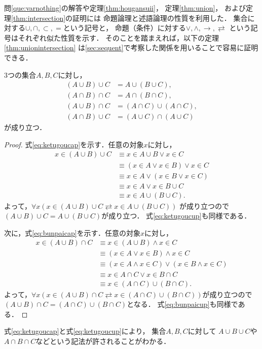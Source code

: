    問\ref{que:varnothing}の解答や定理\ref{thm:hougansuii}，
   定理\ref{thm:union}，
   および定理\ref{thm:intersection}の証明には
   命題論理と述語論理の性質を利用した．
   集合に対する$\cup ,  \cap ,  \subset ,  =$という記号と，
   命題（条件）に対する$\lor ,  \land ,  \to ,  \rightleftarrows$
   という記号はそれぞれ似た性質を示す．
   そのことを踏まえれば，以下の定理\ref{thm:unionintersection}
   は\ref{sec:sequent}で考察した関係を用いることで容易に証明できる．
   \begin{thm} \label{thm:unionintersection}
     3つの集合$A,  B,  C$に対し，
     \begin{align}
       (A \cup B ) \cup C & = A \cup (B \cup C) ,
       \label{eq:ketugoucap} \\
       (A \cap B) \cap C & = A \cap (B \cap C),
       \label{eq:ketugoucup} \\
       (A \cup B) \cap C & = ( A \cap C) \cup (A \cap C),
       \label{eq:bunpaicap} \\
       (A \cap B) \cup C & = ( A \cup C) \cap (A \cup C)
       \label{eq:bunpaicup}
     \end{align}
     が成り立つ．
   \end{thm}
   \begin{proof}
     式\eqref{eq:ketugoucap}を示す．任意の対象$x$に対し，
     \begin{align*}
       x \in (A \cup B) \cup C & \equiv x \in A \cup B \lor x \in C \\
       & \equiv ( x \in A \lor x \in B) \lor x \in C \\
       & \equiv x \in A \lor ( x \in B \lor x \in C) \\
       & \equiv x \in A \lor x \in B \cup C \\
       & \equiv x \in A \cup ( B \cup C) . 
     \end{align*}
     よって，$\forall x ( x \in ( A \cup B) \cup C \rightleftarrows x \in A \cup (B \cup C))$
     が成り立つので$(A \cup B) \cup C = A \cup (B \cup C)$が成り立つ．
     式\eqref{eq:ketugoucup}も同様である．

     次に，式\eqref{eq:bunpaicap}を示す．任意の対象$x$に対し，
     \begin{align*}
       x \in (A \cup B) \cap C & \equiv x \in (A \cup B) \land x \in C \\
                               & \equiv (x \in A \lor x \in B) \land x \in C \\
                               & \equiv (x \in A \land x \in C) \lor (x \in B \land x \in C) \\
                               & \equiv x \in A \cap C \lor x \in B \cap C \\
                               & \equiv x \in (A \cap C ) \cup (B \cap C) . 
     \end{align*}
     よって，$\forall x ( x \in (A \cup B) \cap C \rightleftarrows 
     x \in (A \cap C) \cup (B \cap C))$が成り立つので
              $(A \cup B) \cap C = (A \cap C) \cup (B \cap C)$となる．
      式\eqref{eq:bunpaicup}も同様である．
   \end{proof}
   式\eqref{eq:ketugoucap}と式\eqref{eq:ketugoucup}により，
   集合$A,  B,  C$に対して
   $A \cup B \cup C$や$A \cap B \cap C$などという記法が許されることがわかる．
    
